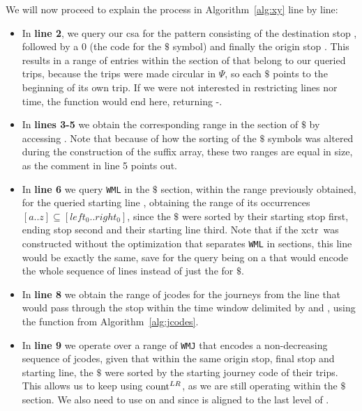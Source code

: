     We will now proceed to explain the process in Algorithm~\ref{alg:xy} line by line:
    \begin{itemize}
        \item In \textbf{line 2}, we query our \gls{csa} for the pattern consisting of the destination stop , followed by a 0 (the code for the $\$$ symbol) and finally the origin stop . This results in a range of entries within the section of  that belong to our queried trips, because the trips were made circular in $\Psi$, so each $\$$ points to the beginning of its own trip. If we were not interested in restricting lines nor time, the function would end here, returning -.
        
        \item In \textbf{lines 3-5} we obtain the corresponding range in the section of $\$$ by accessing \FuncSty{$\Psi$}. Note that because of how the sorting of the $\$$ symbols was altered during the construction of the suffix array, these two ranges are equal in size, as the comment in line 5 points out.
        
        \item In \textbf{line 6} we query \texttt{WML} in the $\$$ section, within the range previously obtained, for the queried starting line , obtaining the range of its occurrences $[a..z] \subseteq [left_0..right_0]$, since the $\$$ were sorted by their starting stop first, ending stop second and their starting line third. Note that if the \gls{xctr}~was constructed without the optimization that separates \texttt{WML} in sections, this line would be exactly the same, save for the query being on a  that would encode the whole sequence of lines instead of just the  for $\$$.
        
        \item In \textbf{line 8} we obtain the range of jcodes for the journeys from the line  that would pass through the stop  within the time window delimited by  and , using the function  from Algorithm~\ref{alg:jcodes}.
        
        \item In \textbf{line 9} we operate over a range of \texttt{WMJ} that encodes a non-decreasing sequence of jcodes, given that within the same origin stop, final stop and starting line, the $\$$ were sorted by the starting journey code of their trips. This allows us to keep using $\operatorname{count}^{LR}$, as we are still operating within the $\$$ section. We also need to use  on  and  since  is aligned to the last level of .
        

\end{itemize}
